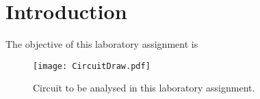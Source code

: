 \section{Introduction}

The objective of this laboratory assignment is 

\begin{figure}[H] \centering
  \texttt{[image: CircuitDraw.pdf]}
  \caption{Circuit to be analysed in this laboratory assignment.}
  \label{fig:CircuitDraw}
\end{figure}
